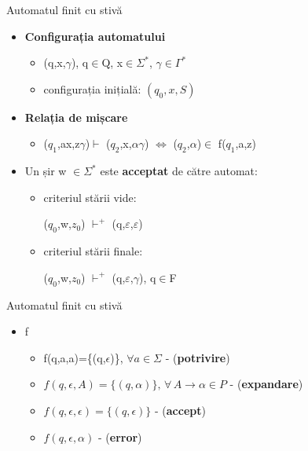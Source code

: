 \documentclass[pdf]{beamer}
\begin{document}
\begin{frame}{Automatul finit cu stivă}
\begin{itemize}

\item
\textbf{Configurația automatului}

\begin{itemize}
\item
(q,x,$\gamma$), q$\in$Q, x$\in\Sigma^{*}$, $\gamma\in\Gamma^{*}$

\item
configurația inițială: $(q_0,x,S)$

\end{itemize}

\item
\textbf{Relația de mișcare}

\begin{itemize}
\item
($q_{1}$,ax,z$\gamma$)$\vdash$ ($q_{2}$,x,$\alpha\gamma$) $\Leftrightarrow$ ($q_{2}$,$\alpha$)$\in$ f($q_{1}$,a,z)
\end{itemize}

\item
Un șir w $\in\Sigma^{*}$ este \textbf{acceptat} de către automat:

\begin{itemize}
\item
criteriul stării vide:

 ($q_{0}$,w,$z_{0}$) $\vdash^+$ (q,$\varepsilon$,$\varepsilon$)

\item
criteriul stării finale:

($q_{0}$,w,$z_{0}$) $\vdash^+$ (q,$\varepsilon$,$\gamma$), q$\in$F
\end{itemize}

\end{itemize}
\end{frame}



\begin{frame}{Automatul finit cu stivă}

\begin{itemize}
\item
f

\begin{itemize}
\item
f(q,a,a)=\{(q,$\epsilon$)\}, $\forall a \in \Sigma$ - (\textbf{potrivire})

\item
$f(q,\epsilon , A)=\{(q,\alpha )\}, \, \forall \, A \to \alpha \in P$ - (\textbf{expandare})

\item
$f(q,\epsilon,\epsilon)=\{(q,\epsilon)\}$ - (\textbf{accept})

\item
$f(q,\epsilon,\alpha)$ - (\textbf{error})
\end{itemize}
\end{itemize}
\end{frame}
\end{document}
